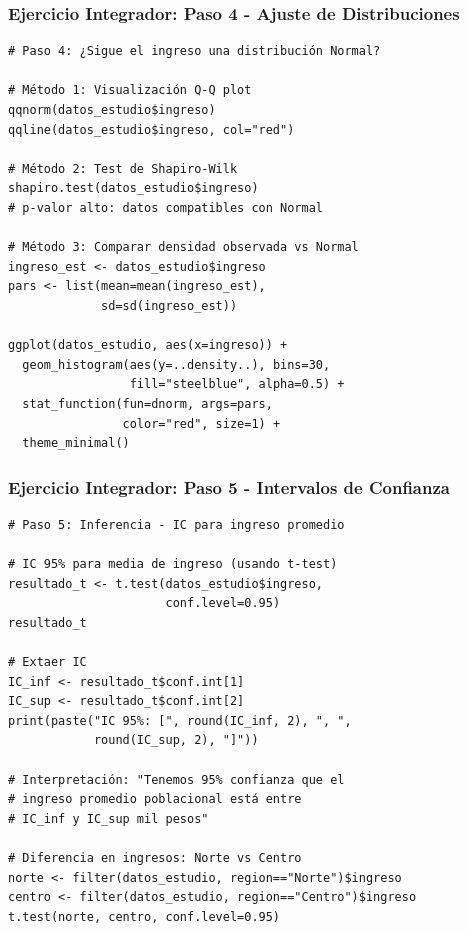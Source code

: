 \documentclass[aspectratio=169,11pt]{beamer}
\begin{document}
\begin{frame}[fragile]
\frametitle{Ejercicio Integrador: Paso 4 - Ajuste de Distribuciones}
\begin{lstlisting}
# Paso 4: ¿Sigue el ingreso una distribución Normal?

# Método 1: Visualización Q-Q plot
qqnorm(datos_estudio$ingreso)
qqline(datos_estudio$ingreso, col="red")

# Método 2: Test de Shapiro-Wilk
shapiro.test(datos_estudio$ingreso)
# p-valor alto: datos compatibles con Normal

# Método 3: Comparar densidad observada vs Normal
ingreso_est <- datos_estudio$ingreso
pars <- list(mean=mean(ingreso_est),
             sd=sd(ingreso_est))

ggplot(datos_estudio, aes(x=ingreso)) +
  geom_histogram(aes(y=..density..), bins=30,
                 fill="steelblue", alpha=0.5) +
  stat_function(fun=dnorm, args=pars,
                color="red", size=1) +
  theme_minimal()
\end{lstlisting}
\end{frame}

\begin{frame}[fragile]
\frametitle{Ejercicio Integrador: Paso 5 - Intervalos de Confianza}
\begin{lstlisting}
# Paso 5: Inferencia - IC para ingreso promedio

# IC 95% para media de ingreso (usando t-test)
resultado_t <- t.test(datos_estudio$ingreso,
                      conf.level=0.95)
resultado_t

# Extaer IC
IC_inf <- resultado_t$conf.int[1]
IC_sup <- resultado_t$conf.int[2]
print(paste("IC 95%: [", round(IC_inf, 2), ", ",
            round(IC_sup, 2), "]"))

# Interpretación: "Tenemos 95% confianza que el
# ingreso promedio poblacional está entre
# IC_inf y IC_sup mil pesos"

# Diferencia en ingresos: Norte vs Centro
norte <- filter(datos_estudio, region=="Norte")$ingreso
centro <- filter(datos_estudio, region=="Centro")$ingreso
t.test(norte, centro, conf.level=0.95)
\end{lstlisting}
\end{frame}
\end{document}
